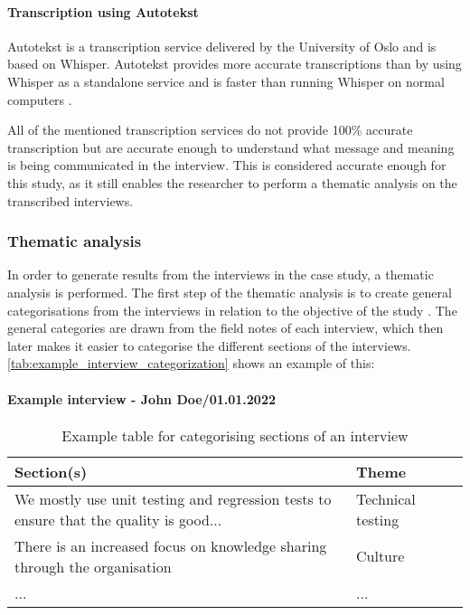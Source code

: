 \paragraph{Transcription using Autotekst}
Autotekst is a transcription service delivered by the University of Oslo and is based on Whisper. Autotekst provides more accurate transcriptions than by using Whisper as a standalone service and is faster than running Whisper on normal computers \cite{autotekst_2023}.

All of the mentioned transcription services do not provide 100\% accurate transcription but are accurate enough to understand what message and meaning is being communicated in the interview. This is considered accurate enough for this study, as it still enables the researcher to perform a thematic analysis on the transcribed interviews.

\subsubsection{Thematic analysis}
In order to generate results from the interviews in the case study, a thematic analysis is performed. The first step of the thematic analysis is to create general categorisations from the interviews in relation to the objective of the study \cite{bjo_2022}. The general categories are drawn from the field notes of each interview, which then later makes it easier to categorise the different sections of the interviews. \autoref{tab:example_interview_categorization} shows an example of this:

\paragraph{Example interview - John Doe/01.01.2022} \hspace{0cm}
\begin{table}[H]
\begin{tabular}{|p{0.75\linewidth}|p{0.25\linewidth}|}
\hline
\textbf{Section(s)} & \textbf{Theme} \\ \hline
We mostly use unit testing and regression tests to ensure that the quality is good... & Technical testing \\ \hline
There is an increased focus on knowledge sharing through the organisation & Culture \\ \hline
... & ... \\ \hline
\end{tabular}
\caption{Example table for categorising sections of an interview}
\label{tab:example_interview_categorization}
\end{table}

